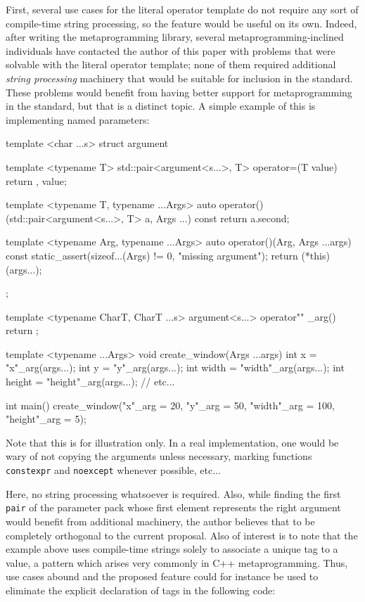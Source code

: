 \documentclass[11pt]{article}
\newcommand{\cc}[1]{\texttt{#1}}
\begin{document}
First, several use cases for the literal operator template do not require any
sort of compile-time string processing, so the feature would be useful on its
own. Indeed, after writing the \cite{Boost.Hana} metaprogramming library,
several metaprogramming-inclined individuals have contacted the author of this
paper with problems that were solvable with the literal operator template; none
of them required additional \textit{string processing} machinery that would be
suitable for inclusion in the standard. These problems would benefit from
having better support for metaprogramming in the standard, but that is a
distinct topic. A simple example of this is implementing named parameters:

\begin{cpp}
template <char ...s>
struct argument {
  template <typename T>
  std::pair<argument<s...>, T> operator=(T value) {
    return {{}, value};
  }

  template <typename T, typename ...Args>
  auto operator()(std::pair<argument<s...>, T> a, Args ...) const {
    return a.second;
  }

  template <typename Arg, typename ...Args>
  auto operator()(Arg, Args ...args) const {
    static_assert(sizeof...(Args) != 0, "missing argument");
    return (*this)(args...);
  }
};

template <typename CharT, CharT ...s>
argument<s...> operator"" _arg() { return {}; }

template <typename ...Args>
void create_window(Args ...args) {
  int x = "x"_arg(args...);
  int y = "y"_arg(args...);
  int width = "width"_arg(args...);
  int height = "height"_arg(args...);
  // etc...
}

int main() {
  create_window("x"_arg = 20, "y"_arg = 50, "width"_arg = 100, "height"_arg = 5);
}
\end{cpp}

Note that this is for illustration only. In a real implementation, one would
be wary of not copying the arguments unless necessary, marking functions
\cc{constexpr} and \cc{noexcept} whenever possible, etc...

Here, no string processing whatsoever is required. Also, while finding the
first \cc{pair} of the parameter pack whose first element represents the right
argument would benefit from additional machinery, the author believes that to
be completely orthogonal to the current proposal. Also of interest is to note
that the example above uses compile-time strings solely to associate a unique
tag to a value, a pattern which arises very commonly in C++ metaprogramming.
Thus, use cases abound and the proposed feature could for instance be used to
eliminate the explicit declaration of tags in the following code:
\end{document}

